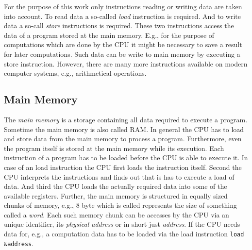 \documentclass[onecolumn, openany, master, english, seal, signatures]{dbrgrptt}
\begin{document}
For the purpose of this work only instructions reading or writing data are taken into account. To read data a so-called \emph{load} instruction is required. And to write data a so-call \emph{store} instructions is required. These two instructions access the data of a program stored at the main memory. E.g., for the purpose of computations which are done by the \ac{CPU} it might be necessary to save a result for later computations. Such data can be write to main memory by executing a store instruction. However, there are many more instructions available on modern computer systems, e.g., arithmetical operations.

\subsection{Main Memory}
The \emph{main memory} is a storage containing all data required to execute a program. Sometime the main memory is also called \ac{RAM}. In general the CPU has to load and store data from the main memory to process a program. Furthermore, even the program itself is stored at the main memory while its execution. Each instruction of a program has to be loaded before the \ac{CPU} is able to execute it. In case of an load instruction the \ac{CPU} first loads the instruction itself. Second the CPU interprets the instructions and finds out that is has to execute a load of data. And third the \ac{CPU} loads the actually required data into some of the available registers.
Further, the main memory is structured in equally sized chunks of memory, e.g., 8 byte which is called represents the size of something called a \emph{word}. Each such memory chunk can be accesses by the \ac{CPU} via an unique identifier, its \emph{physical address} or in short just \emph{address}. If the CPU needs data for, e.g., a computation data has to be loaded via the load instruction \texttt{load \&address}.
\end{document}
